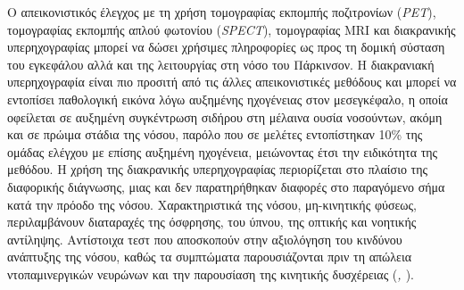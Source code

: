 \documentclass[12pt]{report}
\begin{document}
        \par
        Ο απεικονιστικός έλεγχος με τη χρήση τομογραφίας εκπομπής ποζιτρονίων (\emph{PET}), τομογραφίας εκπομπής απλού φωτονίου (\emph{SPECT}), τομογραφίας MRI και διακρανικής υπερηχογραφίας μπορεί να δώσει χρήσιμες πληροφορίες ως προς τη δομική σύσταση του εγκεφάλου αλλά και της λειτουργίας στη νόσο του Πάρκινσον. Η διακρανιακή υπερηχογραφία είναι πιο προσιτή από τις άλλες απεικονιστικές μεθόδους και μπορεί να εντοπίσει παθολογική εικόνα λόγω αυξημένης ηχογένειας στον μεσεγκέφαλο, η οποία οφείλεται σε αυξημένη συγκέντρωση σιδήρου στη μέλαινα ουσία νοσούντων, ακόμη και σε πρώιμα στάδια της νόσου, παρόλο που σε μελέτες εντοπίστηκαν 10\% της ομάδας ελέγχου με επίσης αυξημένη ηχογένεια, μειώνοντας έτσι την ειδικότητα της μεθόδου. Η χρήση της διακρανικής υπερηχογραφίας περιορίζεται στο πλαίσιο της διαφορικής διάγνωσης, μιας και δεν παρατηρήθηκαν διαφορές στο παραγόμενο σήμα κατά την πρόοδο της νόσου. Χαρακτηριστικά της νόσου, μη-κινητικής φύσεως, περιλαμβάνουν διαταραχές της όσφρησης, του ύπνου, της οπτικής και νοητικής αντίληψης. Αντίστοιχα τεστ που αποσκοπούν στην αξιολόγηση του κινδύνου ανάπτυξης της νόσου, καθώς τα συμπτώματα παρουσιάζονται πριν τη απώλεια ντοπαμινεργικών νευρώνων και την παρουσίαση της κινητικής δυσχέρειας (\emph{\cite{Miller2015BiomarkersFuture}, \cite{Zarkali2024NeuroimagingInterventions}}).  
        
\end{document}
